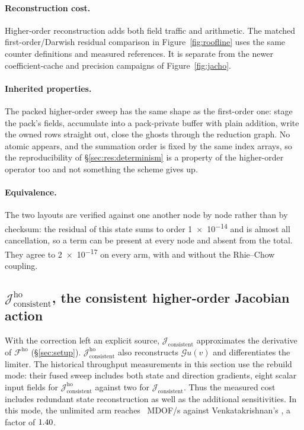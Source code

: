 \documentclass[sigconf,nonacm]{acmart}
\newcommand{\Gop}{\mathcal{G}}
\newcommand{\Fho}{\mathcal{F}^{\mathrm{ho}}}
\newcommand{\Jex}{\mathcal{J}_{\mathrm{consistent}}}
\newcommand{\Jhoex}{\mathcal{J}^{\mathrm{ho}}_{\mathrm{consistent}}}
\begin{document}
\paragraph{Reconstruction cost.}
Higher-order reconstruction adds both field traffic and arithmetic.
The matched first-order/Darwish residual comparison in Figure~\ref{fig:roofline}
uses the same counter definitions and measured references. It is separate from
the newer coefficient-cache and precision campaigns of Figure~\ref{fig:jacho}.

\paragraph{Inherited properties.} The packed higher-order
sweep has the same shape as the first-order one: stage the pack's fields, accumulate into a
pack-private buffer with plain addition, write the owned rows straight out, close the ghosts
through the reduction graph. No atomic appears, and the summation order is fixed by the same
index arrays, so the reproducibility of \S\ref{sec:res:determinism} is a property of the
higher-order operator too and not something the scheme gives up.

\paragraph{Equivalence.} The two layouts are verified against one another node by node rather
than by checksum: the residual of this state sums to order \num{1e-14} and is almost all
cancellation, so a term can be present at every node and absent from the total. They agree to
\num{2e-17} on every arm, with and without the Rhie--Chow coupling.

\subsection{$\Jhoex$, the consistent higher-order Jacobian action}
\label{sec:res:hoexact}

With the correction left an explicit source, $\Jex$ approximates the derivative of $\Fho$
(\S\ref{sec:setup}). $\Jhoex$ also reconstructs $\Gop u(v)$ and differentiates the limiter.
The historical throughput measurements in this section use the rebuild mode: their fused sweep includes both
state and direction gradients, eight scalar input fields for $\Jhoex$ against two for
$\Jex$. Thus the measured cost includes redundant state reconstruction as well as the
additional sensitivities. In this mode, the unlimited arm reaches
\hoxExactPackedUnlim{}~MDOF/s against Venkatakrishnan's \hoxExactPacked{}, a factor of
$1.40$.
\end{document}
